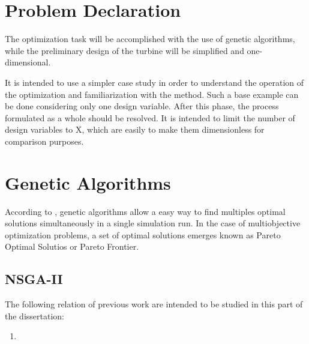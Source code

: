 \section{Problem Declaration}
The optimization task will be accomplished with the use of genetic algorithms, while the preliminary design of the turbine will be simplified and one-dimensional.

It is intended to use a simpler case study in order to understand the operation of the optimization and familiarization with the method. Such a base example can be done considering only one design variable. After this phase, the process formulated as a whole should be resolved. It is intended to limit the number of design variables to X, which are easily to make them dimensionless for comparison purposes.

\section{Genetic Algorithms}
According to \cite{Deb2012}, genetic algorithms allow a easy way to find multiples optimal solutions simultaneously in a single simulation run. In the case of multiobjective optimization problems, a set of optimal solutions emerges known as Pareto Optimal Solutios or Pareto Frontier.

\subsection{NSGA-II}
The following relation of previous work are intended to be studied in this part of the dissertation:
\begin{enumerate}
    \item \cite{Deb2002}
\end{enumerate}